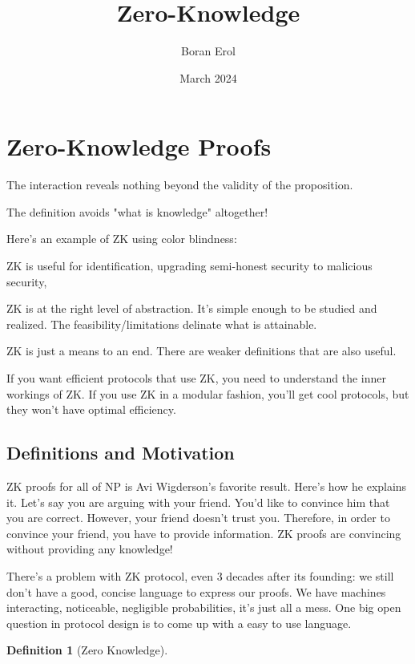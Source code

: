 \documentclass{article}
\title{Zero-Knowledge}
\date{March 2024}
\author{Boran Erol}
\theoremstyle{definition}
\newtheorem{definition}{Definition}
\begin{document}
\maketitle

\section{Zero-Knowledge Proofs}

The interaction reveals nothing beyond the validity of the proposition.

The definition avoids "what is knowledge" altogether!

Here's an example of ZK using color blindness:

ZK is useful for identification, upgrading semi-honest security to malicious security, 



ZK is at the right level of abstraction. It's simple enough to be studied and realized. The feasibility/limitations
delinate what is attainable.

ZK is just a means to an end. There are weaker definitions that are also useful.

If you want efficient protocols that use ZK, you need to understand the inner workings of ZK. If you use
ZK in a modular fashion, you'll get cool protocols, but they won't have optimal efficiency.

\subsection{Definitions and Motivation}



ZK proofs for all of NP is Avi Wigderson's favorite result. Here's how he explains it.
Let's say you are arguing with your friend. You'd like to convince him that
you are correct. However, your friend doesn't trust you. Therefore, in order to
convince your friend, you have to provide information. ZK proofs are convincing without
providing any knowledge!

There's a problem with ZK protocol, even 3 decades after its founding: we still don't have a
good, concise language to express our proofs. We have machines interacting, noticeable, negligible probabilities,
it's just all a mess. One big open question in protocol design is to come up with a easy to use language.

\begin{definition}[Zero Knowledge]
    
\end{definition}
\end{document}
